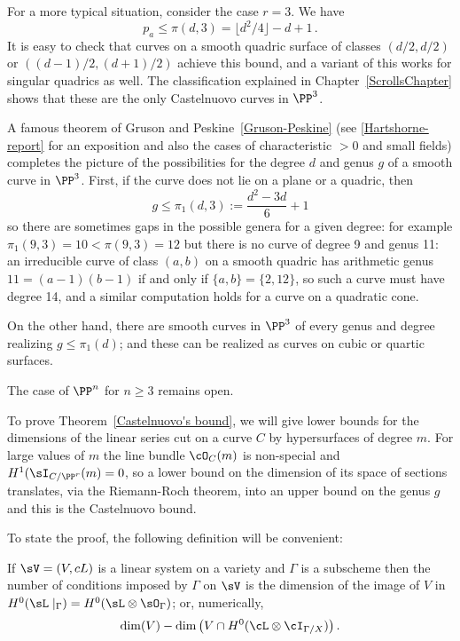 \begin{example}For a more typical situation, consider the case $r=3$. We have
$$
p_a \leq \pi(d,3) = \lfloor d^2/4 \rfloor-d+1\, .
$$
It is easy to check that curves on a smooth quadric surface of classes
$(d/2, d/2)$ or $((d-1)/2, (d+1)/2)$
achieve this bound, and a variant of this works for singular quadrics as well. The classification  explained in Chapter~\ref{ScrollsChapter}
shows that these are the only Castelnuovo curves in $\PP^3$.
\end{example}

\begin{fact}
A famous theorem of Gruson and Peskine~\ref{Gruson-Peskine} (see \ref{Hartshorne-report} for an exposition and also the cases of characteristic $>0$ and small fields) completes the picture of the possibilities for the degree $d$ and  genus $g$  of a smooth curve in $\PP^3$. First, if the curve does not lie on a plane or a quadric, then
$$
g\leq \pi_1(d,3) := \frac{d^2-3d}{6} +1
$$
so there are  sometimes gaps in the possible genera for a given degree: for example  $\pi_1(9,3) = 10<\pi(9,3) =12$ but there is
no curve of degree 9 and genus 11: an irreducible curve of class $(a,b)$ on a smooth quadric has arithmetic genus $11 = (a-1)(b-1)$
if and only if $\{a,b\} = \{2,12\}$, so such a curve must have degree 14, and a similar computation holds for a curve on a quadratic cone.

On the other hand, there are smooth curves in $\PP^3$ of every genus and degree realizing $g\leq \pi_1(d)$; and these can be realized as curves
on cubic or quartic surfaces.

The case of $\PP^n$ for $n\geq 3$ remains open. 
\end{fact}
To prove Theorem~\ref{Castelnuovo's bound}, we will give lower bounds for the dimensions of the linear series  cut on a curve $C$ by hypersurfaces of degree $m$. For large values of $m$ the line bundle $\cO_C(m)$ is non-special and $H^1(\sI_{C/\PP^r}(m) = 0$, so a lower bound on the dimension of its space of sections translates, via the Riemann-Roch theorem, into an upper bound on the genus $g$ and this is the Castelnuovo bound.

To state the proof, the following definition will be convenient:

\begin{definition}
If $\sV = (V,cL)$ is a linear system on a variety and $\Gamma$ is a subscheme then the number of conditions
imposed by $\Gamma$ on $\sV$ is the dimension of the image of $V$ in $H^0(\sL\mid_\Gamma) = H^0(\sL \otimes \sO_\Gamma)$; or, numerically,
$$
\dim(V) - \dim \left(V \cap H^0(\cL\otimes \cI_{\Gamma/X}) \right).
$$\end{definition}

